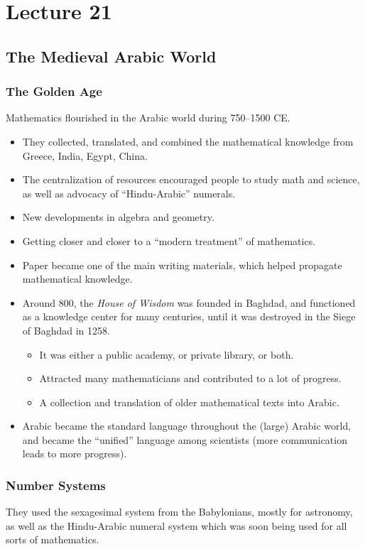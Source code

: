\documentclass[class=article, crop=false]{standalone}
\begin{document}
  \section{Lecture 21}
  \subsection{The Medieval Arabic World}
  \subsubsection{The Golden Age}
  Mathematics flourished in the Arabic world during 750--1500 CE.
  \begin{itemize}
    \item They collected, translated, and combined the mathematical knowledge from Greece, India, Egypt, China.
    \item The centralization of resources encouraged people to study math and science, as well as advocacy of ``Hindu-Arabic'' numerals.
    \item New developments in algebra and geometry.
    \item Getting closer and closer to a ``modern treatment'' of mathematics.
    \item Paper became one of the main writing materials, which helped propagate mathematical knowledge.
    \item Around 800, the \emph{House of Wisdom} was founded in Baghdad, and functioned as a knowledge center for many centuries, until it was destroyed in the Siege of Baghdad in 1258.
    \begin{itemize}
      \item It was either a public academy, or private library, or both.
      \item Attracted many mathematicians and contributed to a lot of progress.
      \item A collection and translation of older mathematical texts into Arabic.
    \end{itemize}
    \item Arabic became the standard language throughout the (large) Arabic world, and became the ``unified'' language among scientists (more communication leads to more progress).
  \end{itemize}
  \subsubsection{Number Systems}
  They used the sexagesimal system from the Babylonians, mostly for astronomy, as well as the Hindu-Arabic numeral system which was soon being used for all sorts of mathematics.
\end{document}

